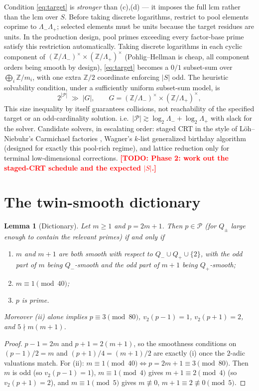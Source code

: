 \documentclass[11pt]{article}
\newtheorem{lemma}[theorem]{Lemma}
\theoremstyle{remark}
\newcommand{\todo}[1]{\textcolor{red}{\textbf{[TODO: #1]}}}
\newcommand{\Z}{\mathbb{Z}}
\newcommand{\cP}{\mathcal{P}}
\begin{document}
Condition \eqref{eq:target} is \emph{stronger} than (c),(d) --- it imposes the
full lcm rather than the lcm over $S$. Before taking discrete logarithms,
restrict to pool elements coprime to $\Lambda_-\Lambda_+$; selected elements
must be units because the target residues are units. In the production
design, pool primes exceeding every factor-base prime satisfy this
restriction automatically. Taking discrete logarithms in each cyclic component of
$(\Z/\Lambda_-)^\times \times (\Z/\Lambda_+)^\times$ (Pohlig--Hellman
\cite{PH78} is cheap, all component orders being smooth by design),
\eqref{eq:target} becomes a $0/1$ subset-sum over $\bigoplus_i \Z/m_i$, with
one extra $\Z/2$ coordinate enforcing $|S|$ odd. The heuristic solvability
condition, under a sufficiently uniform subset-sum model, is
\begin{equation}\label{eq:feas}
2^{|\cP|} \;\gg\; |G|, \qquad G = (\Z/\Lambda_-)^\times \times
(\Z/\Lambda_+)^\times,
\end{equation}
This size inequality by itself guarantees collisions, not reachability of
the specified target or an odd-cardinality solution.
i.e.\ $|\cP| \gtrsim \log_2 \Lambda_- + \log_2 \Lambda_+$ with slack for the
solver. Candidate solvers, in escalating order: staged CRT in the style of
L\"oh--Niebuhr's Carmichael factories \cite{LN}, Wagner's $k$-list generalized
birthday algorithm \cite{Wagner} (designed for exactly this pool-rich regime),
and lattice reduction only for terminal low-dimensional corrections.
\todo{Phase 2: work out the staged-CRT schedule and the expected $|S|$.}

\section{The twin-smooth dictionary}\label{sec:twin}

\begin{lemma}[Dictionary]\label{lem:dict}
Let $m \ge 1$ and $p = 2m+1$. Then $p \in \cP$ (for $Q_\pm$ large enough to
contain the relevant primes) if and only if
\begin{enumerate}\itemsep1pt
\item[(i)] $m$ and $m+1$ are both smooth with respect to $Q_- \cup Q_+ \cup
\{2\}$, with the odd part of $m$ being $Q_-$-smooth and the odd part of $m+1$
being $Q_+$-smooth;
\item[(ii)] $m \equiv 1 \pmod{40}$;
\item[(iii)] $p$ is prime.
\end{enumerate}
Moreover (ii) alone implies $p \equiv 3 \pmod{80}$, $v_2(p-1)=1$,
$v_2(p+1)=2$, and $5 \nmid m(m+1)$.
\end{lemma}
\begin{proof}
$p - 1 = 2m$ and $p+1 = 2(m+1)$, so the smoothness conditions on
$(p-1)/2 = m$ and $(p+1)/4 = (m+1)/2$ are exactly (i) once the $2$-adic
valuations match. For (ii): $m \equiv 1 \pmod{40} \iff p = 2m+1 \equiv 3
\pmod{80}$. Then $m$ is odd (so $v_2(p-1)=1$), $m \equiv 1 \pmod 4$ gives
$m + 1 \equiv 2 \pmod 4$ (so $v_2(p+1) = 2$), and $m \equiv 1 \pmod 5$ gives
$m \not\equiv 0$, $m+1 \equiv 2 \not\equiv 0 \pmod 5$.
\end{proof}
\end{document}
